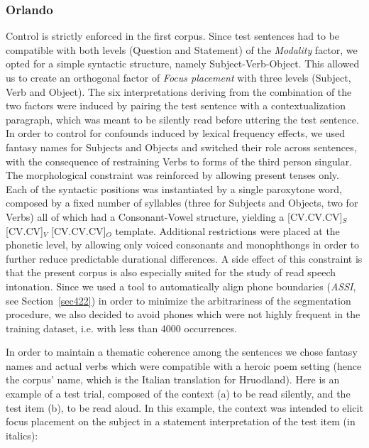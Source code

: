 \subsubsection{Orlando}\label{sec4211}
Control is strictly enforced in the first corpus. Since test sentences had to be compatible with both levels (Question and Statement) of the \textit{Modality} factor, we opted for a simple syntactic structure, namely Subject-Verb-Object. This allowed us to create an orthogonal factor of \textit{Focus placement} with three levels (Subject, Verb and Object). The six interpretations deriving from the combination of the two factors were induced by pairing the test sentence with a contextualization paragraph, which was meant to be silently read before uttering the test sentence. In order to control for confounds induced by lexical frequency effects, we used fantasy names for Subjects and Objects and switched their role across sentences, with the consequence of restraining Verbs to forms of the third person singular. The morphological constraint was reinforced by allowing present tenses only. Each of the syntactic positions was instantiated by a single paroxytone word, composed by a fixed number of syllables (three for Subjects and Objects, two for Verbs) all of which had a Consonant-Vowel structure, yielding a [CV.\textipa{\textvbaraccent{}}CV.CV]$_{S}$ [\textipa{\textvbaraccent{}}CV.CV]$_{V}$ [CV.\textipa{\textvbaraccent{}}CV.CV]$_{O}$ template. Additional restrictions were placed at the phonetic level, by allowing only voiced consonants and monophthongs in order to further reduce predictable durational differences. A side effect of this constraint is that the present corpus is also especially suited for the study of read speech intonation. Since we used a tool to automatically align phone boundaries (\textit{ASSI}, see Section~\ref{sec422}) in order to minimize the arbitrariness of the segmentation procedure, we also decided to avoid phones which were not highly frequent in the training dataset, i.e. with less than 4000 occurrences. 

In order to maintain a thematic coherence among the sentences we chose fantasy names and actual verbs which were compatible with a heroic poem setting (hence the corpus' name, which is the Italian translation for Hruodland). Here is an example of a test trial, composed of the context (a) to be read silently, and the test item (b), to be read aloud. In this example, the context was intended to elicit focus placement on the subject in a statement interpretation of the test item (in italics):

